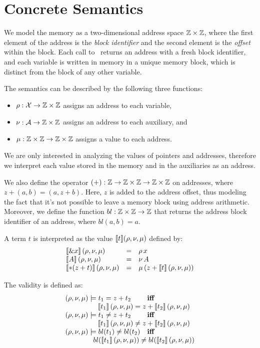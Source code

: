 \chapter{Concrete Semantics} \label{chapter:concrete_semantics}

We model the memory as a two-dimensional address space $\mathbb{Z} \times \mathbb{Z}$,
where the first element of the address is the \emph{block identifier} and the second element is the \emph{offset} within the block.
Each call to \malloc\ returns an address with a fresh block identifier, and each variable is written in memory in a unique memory block,
which is distinct from the block of any other variable.

The semantics can be described by the following three functions:
\begin{itemize}
\item $\rho : \mathcal{X} \rightarrow \mathbb{Z} \times \mathbb{Z}$ assigns an address to each variable,
\item $\nu : \mathcal{A} \rightarrow \mathbb{Z} \times \mathbb{Z}$ assigns an address to each auxiliary, and
\item $\mu : \mathbb{Z} \times \mathbb{Z} \rightarrow \mathbb{Z} \times \mathbb{Z}$ assigns a value to each address.
\end{itemize}
We are only interested in analyzing the values of pointers and addresses, therefore we interpret each value stored in the memory and in the auxiliaries as an address.

We also define the operator $(+) : \mathbb{Z} \rightarrow \mathbb{Z} \times \mathbb{Z} \rightarrow \mathbb{Z} \times \mathbb{Z}$ on addresses, where $z + (a,b) = (a, z+b)$.
Here, $z$ is added to the address offset, thus modeling the fact that it's not possible to leave a memory block using address arithmetic.
Moreover, we define the function $bl : \mathbb{Z} \times \mathbb{Z} \rightarrow \mathbb{Z}$ that returns the address block identifier of an address, where $bl(a,b) = a$.

A term $t$ is interpreted as the value $\llbracket t\rrbracket(\rho, \nu, \mu)$ defined by:
\[
  \begin{array}{lll}
    \llbracket\& x\rrbracket\,(\rho,\nu,\mu)   & = & \rho\,x                          \\
    \llbracket A\rrbracket\,(\rho,\nu,\mu)      & = & \nu\,A                           \\
    \llbracket*(z+t)\rrbracket\,(\rho,\nu,\mu) & = & \mu\,(z+\llbracket t\rrbracket\,(\rho,\nu,\mu)) \\
  \end{array}
\]

The validity is defined as:
\[
  \begin{array}{ll}
    (\rho,\nu,\mu)\models t_1 = z+t_2          & \textbf{iff}
    \\ \multicolumn{2}{c}{\quad\quad\quad\quad\sem{t_1}\,(\rho,\nu,\mu) = z+\sem{t_2}\,(\rho,\nu,\mu)}	\\
    (\rho,\nu,\mu)\models t_1 \neq z+t_2       & \textbf{iff}
    \\ \multicolumn{2}{c}{\quad\quad\quad\quad\sem{t_1}\,(\rho,\nu,\mu) \neq z+\sem{t_2}\,(\rho,\nu,\mu)}	\\
    (\rho,\nu,\mu)\models bl(t_1) \neq bl(t_2) & \textbf{iff}
    \\ \multicolumn{2}{c}{\quad\quad\quad\quad bl(\sem{t_1}\,(\rho, \nu, \mu)) \neq bl(\sem{t_2}\,(\rho, \nu, \mu))}
  \end{array}
\]

